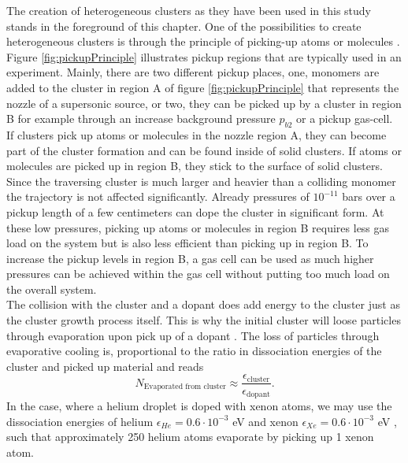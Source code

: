 The creation of heterogeneous clusters as they have been used in this study stands in the foreground of this chapter. One of the possibilities to create heterogeneous clusters is through the principle of picking-up atoms or molecules \cite{Gough-1985-JChemPhys,Haberland-1994-Springer}. Figure \ref{fig:pickupPrinciple} illustrates pickup regions that are typically used in an experiment. Mainly, there are two different pickup places, one, monomers are added to the cluster in region A of figure \ref{fig:pickupPrinciple} that represents the nozzle of a supersonic source, or two, they can be picked up by a cluster in region B for example through an increase background pressure $p_{b2}$ or a pickup gas-cell. If clusters pick up atoms or molecules in the nozzle region A, they can become part of the cluster formation and can be found inside of solid clusters. If atoms or molecules are picked up in region B, they stick to the surface of solid clusters. Since the traversing cluster is much larger and heavier than a colliding monomer the trajectory is not affected significantly. Already pressures of $10^{-11}$ bars over a pickup length of a few centimeters can dope the cluster in significant form. At these low pressures, picking up atoms or molecules in region B requires less gas load on the system but is also less efficient than picking up in region B. To increase the pickup levels in region B, a gas cell can be used as much higher pressures can be achieved within the gas cell without putting too much load on the overall system.\\
The collision with the cluster and a dopant does add energy to the cluster just as the cluster growth process itself. This is why the initial cluster will loose particles through evaporation upon pick up of a dopant \citep{Gomez-2011-JCP}. The loss of particles through evaporative cooling is, proportional to the ratio in dissociation energies of the cluster and picked up material and reads
\begin{equation}
N_{\text{Evaporated from cluster}} \approx \frac{\epsilon_{\text{cluster}}}{\epsilon_{\text{dopant}}}.
\label{eq:evaporated-amount}
\end{equation}
In the case, where a helium droplet is doped with xenon atoms, we may use the dissociation energies of helium $\epsilon_{He}=0.6\cdot 10^{-3}$ eV and xenon $\epsilon_{Xe}=0.6\cdot 10^{-3}$ eV \citep{Gomez-2011-JCP,Gomez-2014-Science}, such that approximately 250 helium atoms evaporate by picking up 1 xenon atom.\\

